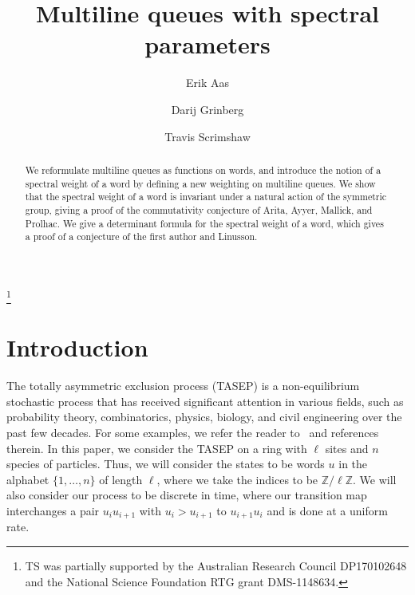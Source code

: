 \documentclass[reqno]{amsart}
\newcommand{\0}{\phantom{c}}
\newcommand{\ZZ}{\mathbb{Z}}
\theoremstyle{plain}
\theoremstyle{definition}
\numberwithin{equation}{section}
\begin{document}
\title[MLQs]{Multiline queues with spectral parameters}

\author[E.~Aas]{Erik Aas}
\address[E. Aas]{Department of Mathematics, Pennsylvania State University, McAllister Building, State College, PA 116802, USA}

\author[D.~Grinberg]{Darij Grinberg}
\address[D. Grinberg]{School of Mathematics, University of Minnesota, 206 Church St. SE, Minneapolis, MN 55455}

\author[T.~Scrimshaw]{Travis Scrimshaw}
\address[T. Scrimshaw]{School of Mathematics and Physics, University of Queensland, St. Lucia, QLD 4072, Australia}


\thanks{TS was partially supported by the Australian Research Council DP170102648 and the National Science Foundation RTG grant DMS-1148634.}

\begin{abstract}
We reformulate multiline queues as functions on words, and introduce the notion of a spectral weight of a word by defining a new weighting on multiline queues.
We show that the spectral weight of a word is invariant under a natural action of the symmetric group, giving a proof of the commutativity conjecture of Arita, Ayyer, Mallick, and Prolhac.
We give a determinant formula for the spectral weight of a word, which gives a proof of a conjecture of the first author and Linusson.
\end{abstract}

\maketitle

\section{Introduction}
\label{sec:introduction}

The totally asymmetric exclusion process (TASEP) is a non-equilibrium stochastic process  that has received significant attention in various fields, such as probability theory, combinatorics, physics, biology, and civil engineering over the past few decades.
For some examples, we refer the reader to~\cite{AasLin17,AAMP,BE07,BP14,DEHP93,KMO15,KMO16} and references therein.
In this paper, we consider the TASEP on a ring with $\ell$ sites and $n$ species of particles.
Thus, we will consider the states to be words $u$ in the alphabet $\{1, \dotsc, n\}$ of length $\ell$, where we take the indices to be $\ZZ / \ell \ZZ$.
We will also consider our process to be discrete in time, where our transition map interchanges a pair $u_i u_{i+1}$ with $u_i > u_{i+1}$ to $u_{i+1} u_i$ and is done at a uniform rate.
\end{document}
